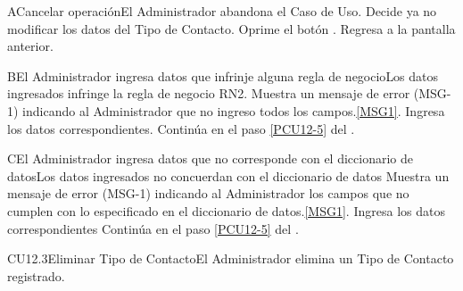		\begin{UCtrayectoriaA}{A}{Cancelar operación}{El Administrador abandona el Caso de Uso.}
			\UCpaso[\UCactor] Decide ya no modificar los datos del Tipo de Contacto.
			\UCpaso[\UCactor] Oprime el botón .
			\UCpaso Regresa a la pantalla anterior.
		\end{UCtrayectoriaA}
		
        \begin{UCtrayectoriaA}{B}{El Administrador ingresa datos que infrinje alguna regla de negocio}{Los datos ingresados infringe la regla de negocio RN2.}
                        \UCpaso Muestra un mensaje de error (MSG-1) indicando al Administrador que no ingreso todos los campos.\ref{MSG1}.
			\UCpaso[\UCactor] Ingresa los datos correspondientes.
			\UCpaso Continúa en el paso \ref{PCU12-5} del .
	\end{UCtrayectoriaA}

        \begin{UCtrayectoriaA}{C}{El Administrador ingresa datos que no corresponde con el diccionario de datos}{Los datos ingresados no concuerdan con el diccionario de datos}
                        \UCpaso Muestra un mensaje de error (MSG-1) indicando al Administrador los campos que no cumplen con lo especificado en el diccionario de datos.\ref{MSG1}.
			\UCpaso[\UCactor] Ingresa los datos correspondientes
			\UCpaso Continúa en el paso \ref{PCU12-5} del .
	\end{UCtrayectoriaA}

	\begin{UseCase}{CU12.3}{Eliminar Tipo de Contacto}{El Administrador elimina un Tipo de Contacto registrado.}
	\end{UseCase}

